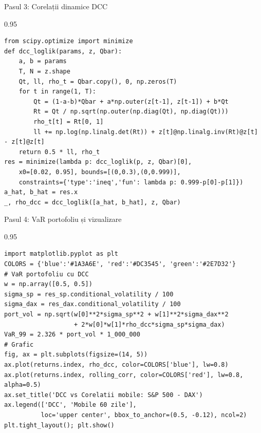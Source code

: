 \documentclass[9pt, aspectratio=169, t]{beamer}
\begin{document}
\begin{frame}[fragile]{Pasul 3: Corelații dinamice DCC}
    \begin{cminipage}{0.95\textwidth}
    {\scriptsize
\begin{lstlisting}
from scipy.optimize import minimize
def dcc_loglik(params, z, Qbar):
    a, b = params
    T, N = z.shape
    Qt, ll, rho_t = Qbar.copy(), 0, np.zeros(T)
    for t in range(1, T):
        Qt = (1-a-b)*Qbar + a*np.outer(z[t-1], z[t-1]) + b*Qt
        Rt = Qt / np.sqrt(np.outer(np.diag(Qt), np.diag(Qt)))
        rho_t[t] = Rt[0, 1]
        ll += np.log(np.linalg.det(Rt)) + z[t]@np.linalg.inv(Rt)@z[t] - z[t]@z[t]
    return 0.5 * ll, rho_t
res = minimize(lambda p: dcc_loglik(p, z, Qbar)[0],
    x0=[0.02, 0.95], bounds=[(0,0.3),(0,0.999)],
    constraints={'type':'ineq','fun': lambda p: 0.999-p[0]-p[1]})
a_hat, b_hat = res.x
_, rho_dcc = dcc_loglik([a_hat, b_hat], z, Qbar)
\end{lstlisting}
    }
    \end{cminipage}
\end{frame}

\begin{frame}[fragile]{Pasul 4: VaR portofoliu și vizualizare}
    \begin{cminipage}{0.95\textwidth}
    {\scriptsize
\begin{lstlisting}
import matplotlib.pyplot as plt
COLORS = {'blue':'#1A3A6E', 'red':'#DC3545', 'green':'#2E7D32'}
# VaR portofoliu cu DCC
w = np.array([0.5, 0.5])
sigma_sp = res_sp.conditional_volatility / 100
sigma_dax = res_dax.conditional_volatility / 100
port_vol = np.sqrt(w[0]**2*sigma_sp**2 + w[1]**2*sigma_dax**2
                   + 2*w[0]*w[1]*rho_dcc*sigma_sp*sigma_dax)
VaR_99 = 2.326 * port_vol * 1_000_000
# Grafic
fig, ax = plt.subplots(figsize=(14, 5))
ax.plot(returns.index, rho_dcc, color=COLORS['blue'], lw=0.8)
ax.plot(returns.index, rolling_corr, color=COLORS['red'], lw=0.8, alpha=0.5)
ax.set_title('DCC vs Corelatii mobile: S&P 500 - DAX')
ax.legend(['DCC', 'Mobile 60 zile'],
          loc='upper center', bbox_to_anchor=(0.5, -0.12), ncol=2)
plt.tight_layout(); plt.show()
\end{lstlisting}
    }
    \end{cminipage}
\end{frame}
\end{document}
